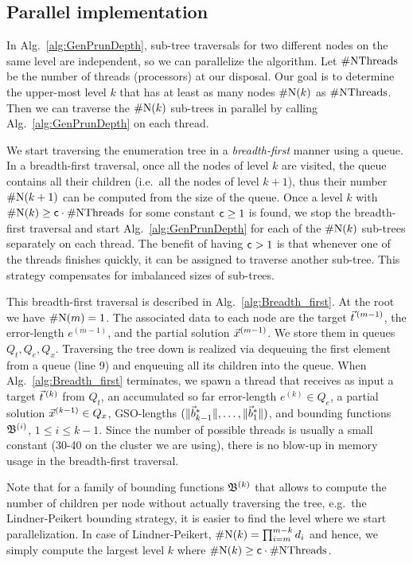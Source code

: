 \subsection{Parallel implementation} \label{sec:MultiThread}

In Alg.~\ref{alg:GenPrunDepth}, sub-tree traversals for two different nodes on the same level are
independent, so we can parallelize the algorithm. Let $\mathrm{\#NThreads}$ be the number of
threads (processors) at our disposal. Our goal is to determine the upper-most level $k$ that has
at least as many nodes $\mathrm{\#N}(k)$ as $\mathrm{\#NThreads}$. Then we can traverse the $\mathrm{\#N}(k)$
sub-trees in parallel by calling Alg.~\ref{alg:GenPrunDepth} on each thread.

We start traversing the enumeration tree in a \emph{breadth-first} manner using a queue.
In a breadth-first traversal, once all the nodes of level $k$ are visited, the queue
contains all their children (i.e.\ all the nodes of level $k+1$), thus their number
$\mathrm{\#N}(k+1)$ can be computed from the size of the queue. Once a level $k$ with $\mathrm{\#N}(k) \geq \mathsf{c} \cdot \mathrm{\#NThreads}$ for
some constant $\mathsf{c} \geq 1$ is found, we stop the breadth-first traversal and start
Alg.~\ref{alg:GenPrunDepth} for each of the $\mathrm{\#N}(k)$ sub-trees separately on each thread. The benefit
of having $\mathsf{c}>1$ is that whenever one of the threads finishes quickly, it can be assigned
to traverse another sub-tree. This strategy compensates for imbalanced sizes of sub-trees.

This breadth-first traversal is described in Alg.~\ref{alg:Breadth_first}. At the root we
have $\mathrm{\#N}(m)=1$. The associated data to each node are the target
$\tvec^{(m-1)}$, the error-length $e^{(m-1)}$, and the partial solution $\vec x^{(m-1)}$.
We store them in queues $Q_t, Q_e, Q_x$. Traversing the tree down is realized via
dequeuing the first element from a queue (line 9) and enqueuing all its children into the
queue. When Alg.~\ref{alg:Breadth_first} terminates, we spawn a thread that receives as
input a target $\tvec^{(k)}$ from $Q_t$, an accumulated so far error-length $e^{(k)}
\in Q_e$, a partial solution $\vec x^{(k-1)} \in  Q_x$, GSO-lengths $(\|\vec b^*_{k-1} \|,
\ldots, \|\vec b^*_{1} \|)$, and bounding functions $\mathfrak{B}^{(i)}$, $1 \leq i \leq k-1$. Since
the number of possible threads is usually a small constant (30-40 on the cluster we are using), there is no blow-up in memory
usage in the breadth-first traversal.

Note that for a family of bounding functions $\mathfrak{B}^{(k)}$ that allows to
compute the number of children per node without actually traversing the tree,
e.g.\ the Lindner-Peikert bounding strategy, it is easier to find the level where we start
parallelization. In case of Lindner-Peikert, $\mathrm{\#N}(k) = \prod_{i=m}^{m-k}
d_i$ and hence, we simply compute the largest level $k$ where $\mathrm{\#N}(k) \geq \mathsf{c} \cdot \mathrm{\#NThreads}$.

